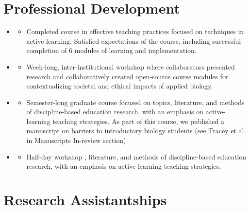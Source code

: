 \documentclass[11pt,a4paper,sans]{moderncv}        %
\begin{document}
\section{Professional Development}
\begin{itemize}
\item{}
\begin{itemize}
\item{\footnotesize{Completed course in effective teaching practices focused on techniques in active learning. Satisfied expectations of the course, including successful completion of 6 modules of learning and implementation.}}
\end{itemize}
\item{}
\begin{itemize}
\item{\footnotesize{Week-long, inter-institutional workshop where collaborators presented research and collaboratively created open-source course modules for contextualizing societal and ethical impacts of applied biology.}}
\end{itemize}
\item{}
\begin{itemize}
\item{\footnotesize{Semester-long graduate course focused on topics, literature, and methods of discipline-based education research, with an emphasis on active-learning teaching strategies. As part of this course, we published a manuscript on barriers to introductory biology students (see Tracey et al. in Manuscripts In-review section)}}
\end{itemize}
\item{}
\begin{itemize}
\item{\footnotesize{Half-day workshop , literature, and methods of discipline-based education research, with an emphasis on active-learning teaching strategies.}}
\end{itemize}
\end{itemize}


\section{Research Assistantships}
\end{document}
